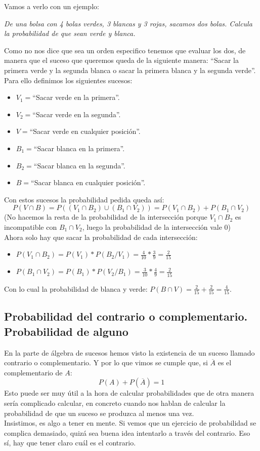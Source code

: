 \documentclass[a4paper,10pt,answers]{exam}
\begin{document}
Vamos a verlo con un ejemplo:
\begin{questions}
\question\emph{De una bolsa con 4 bolas verdes, 3 blancas y 3 rojas, sacamos dos bolas. Calcula la probabilidad de que sean verde y blanca.}
\begin{solution}
Como no nos dice que sea un orden especifico tenemos que evaluar los dos, de manera que el suceso que queremos queda de la siguiente manera: ``Sacar la primera verde y la segunda blanca o sacar la primera blanca y la segunda verde''.\\
Para ello definimos los siguientes sucesos:
\begin{itemize}
	\item $V_1=$``Sacar verde en la primera''.
	\item $V_2=$``Sacar verde en la segunda''.
	\item $V=$``Sacar verde en cualquier posición''.
	\item $B_1=$``Sacar blanca en la primera''.
	\item $B_2=$``Sacar blanca en la segunda''.
	\item $B=$``Sacar blanca en cualquier posición''.
\end{itemize}
Con estos sucesos la probabilidad pedida queda así:
\[P(V \cap B) = P((V_1\cap B_2) \cup (B_1 \cap V_2)) = P(V_1\cap B_2) + P(B_1 \cap V_2)\]
(No hacemos la resta de la probabilidad de la intersección porque $V_1 \cap B_2$ es incompatible con $B_1 \cap V_2$, luego la probabilidad de la intersección vale 0)\\
Ahora solo hay que sacar la probabilidad de cada intersección:
\begin{itemize}
	\item $P(V_1\cap B_2)  = P(V_1) * P(B_2 / V_1) = \frac{4}{10} * \frac{3}{9} = \frac{2}{15}$
	\item $P(B_1 \cap V_2) = P(B_1) * P(V_2 /B_1) = \frac{3}{10} * \frac{4}{9} = \frac{2}{15}$
\end{itemize}
Con lo cual la probabilidad de blanca y verde: $P(B \cap V) = \frac{2}{15} + \frac{2}{15} = \frac{4}{15}$.
\end{solution}
\end{questions}
\subsection{Probabilidad del contrario o complementario. Probabilidad de alguno}
En la parte de álgebra de sucesos hemos visto la existencia de un suceso llamado contrario o complementario. Y por lo que vimos se cumple que, si $\overline{A}$ es el complementario de $A$:
\[P(A) + P(\overline{A}) = 1\]
Esto puede ser muy útil a la hora de calcular probabilidades que de otra manera sería complicado calcular, en concreto cuando nos hablan de calcular la probabilidad de que un suceso se produzca al menos una vez.\\
Insistimos, es algo a tener en mente. Si vemos que un ejercicio de probabilidad se complica demasiado, quizá sea buena idea intentarlo a través del contrario. Eso sí, hay que tener claro cuál es el contrario.\\
\end{document}
